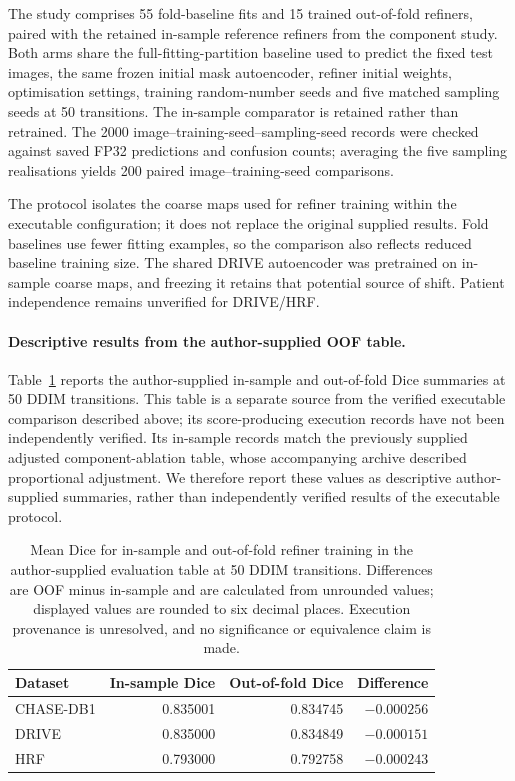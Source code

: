 \documentclass[jimaging,article,submit,pdftex,moreauthors]{Definitions/mdpi}%
\begin{document}
The study comprises 55 fold-baseline fits and 15 trained out-of-fold refiners, paired with the retained in-sample reference refiners from the component study. Both arms share the full-fitting-partition baseline used to predict the fixed test images, the same frozen initial mask autoencoder, refiner initial weights, optimisation settings, training random-number seeds and five matched sampling seeds at 50 transitions. The in-sample comparator is retained rather than retrained. The 2000 image--training-seed--sampling-seed records were checked against saved FP32 predictions and confusion counts; averaging the five sampling realisations yields 200 paired image--training-seed comparisons.

The protocol isolates the coarse maps used for refiner training within the executable configuration; it does not replace the original supplied results. Fold baselines use fewer fitting examples, so the comparison also reflects reduced baseline training size. The shared DRIVE autoencoder was pretrained on in-sample coarse maps, and freezing it retains that potential source of shift. Patient independence remains unverified for DRIVE/HRF.


\paragraph{Descriptive results from the author-supplied OOF table.}
Table~\ref{tab:author_oof_results} reports the author-supplied in-sample and out-of-fold Dice summaries at 50 DDIM transitions. This table is a separate source from the verified executable comparison described above; its score-producing execution records have not been independently verified. Its in-sample records match the previously supplied adjusted component-ablation table, whose accompanying archive described proportional adjustment. We therefore report these values as descriptive author-supplied summaries, rather than independently verified results of the executable protocol.

\begin{table}[htbp]
\centering
\caption{Mean Dice for in-sample and out-of-fold refiner training in the author-supplied evaluation table at 50 DDIM transitions. Differences are OOF minus in-sample and are calculated from unrounded values; displayed values are rounded to six decimal places. Execution provenance is unresolved, and no significance or equivalence claim is made.}
\label{tab:author_oof_results}
\begin{tabular}{lrrr}
\toprule
Dataset & In-sample Dice & Out-of-fold Dice & Difference \\
\midrule
CHASE-DB1 & 0.835001 & 0.834745 & $-0.000256$ \\
DRIVE & 0.835000 & 0.834849 & $-0.000151$ \\
HRF & 0.793000 & 0.792758 & $-0.000243$ \\
\bottomrule
\end{tabular}
\end{table}
\end{document}
